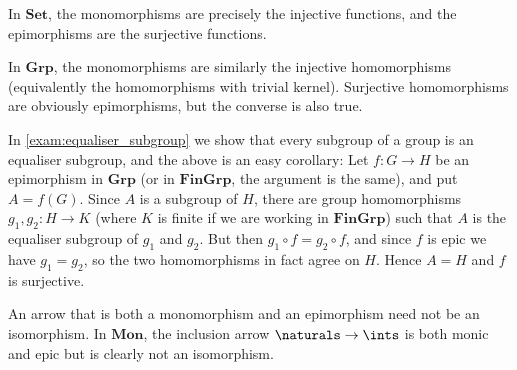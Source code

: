 \documentclass[article, a4paper, 11pt, oneside]{memoir}
\numberwithin{equation}{chapter}
\newcommand{\ncat}[1]{\mathbf{#1}} %
\newcommand{\catSet}{\ncat{Set}}
\newcommand{\catGrp}{\ncat{Grp}}
\newcommand{\catMon}{\ncat{Mon}}
\newcommand{\catFinGrp}{\ncat{FinGrp}}
\theoremstyle{myexample}
\theoremstyle{myexamplebreak}
\begin{document}
\begin{examplebreak}
    \begin{enumexample}
        \item In $\catSet$, the monomorphisms are precisely the injective functions, and the epimorphisms are the surjective functions.
        
        \item In $\catGrp$, the monomorphisms are similarly the injective homomorphisms (equivalently the homomorphisms with trivial kernel). Surjective homomorphisms are obviously epimorphisms, but the converse is also true.
        
        In \cref{exam:equaliser_subgroup} we show that every subgroup of a group is an equaliser subgroup, and the above is an easy corollary: Let $f \colon G \to H$ be an epimorphism in $\catGrp$ (or in $\catFinGrp$, the argument is the same), and put $A = f(G)$. Since $A$ is a subgroup of $H$, there are group homomorphisms $g_1, g_2 \colon H \to K$ (where $K$ is finite if we are working in $\catFinGrp$) such that $A$ is the equaliser subgroup of $g_1$ and $g_2$. But then $g_1 \circ f = g_2 \circ f$, and since $f$ is epic we have $g_1 = g_2$, so the two homomorphisms in fact agree on $H$. Hence $A = H$ and $f$ is surjective.

        \item An arrow that is both a monomorphism and an epimorphism need not be an isomorphism. In $\catMon$, the inclusion arrow $\naturals \to \ints$ is both monic and epic but is clearly not an isomorphism.
    \end{enumexample}
\end{examplebreak}


        
        

\end{document}
